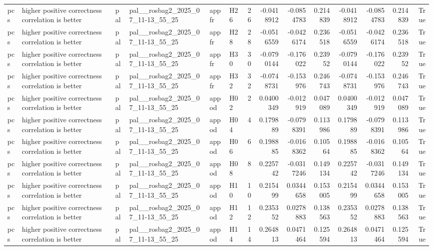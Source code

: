 \begin{longtable}{llllllrrrrrrrr}
pcs & higher positive correctness correlation is better & pal & pal\_\_rosbag2\_2025\_07\_11-13\_55\_25 & appfr & H26 & 26 & -0.0418912 & -0.0854783 & 0.214839 & -0.0418912 & -0.0854783 & 0.214839 & True \\
pcs & higher positive correctness correlation is better & pal & pal\_\_rosbag2\_2025\_07\_11-13\_55\_25 & appfr & H28 & 28 & -0.0516559 & -0.0426174 & 0.236518 & -0.0516559 & -0.0426174 & 0.236518 & True \\
pcs & higher positive correctness correlation is better & pal & pal\_\_rosbag2\_2025\_07\_11-13\_55\_25 & appfr & H30 & 30 & -0.0790144 & -0.176022 & 0.23952 & -0.0790144 & -0.176022 & 0.23952 & True \\
pcs & higher positive correctness correlation is better & pal & pal\_\_rosbag2\_2025\_07\_11-13\_55\_25 & appfr & H32 & 32 & -0.0748731 & -0.153976 & 0.246743 & -0.0748731 & -0.153976 & 0.246743 & True \\
pcs & higher positive correctness correlation is better & pal & pal\_\_rosbag2\_2025\_07\_11-13\_55\_25 & appod & H02 & 2 & 0.0400349 & -0.012919 & 0.047089 & 0.0400349 & -0.012919 & 0.047089 & True \\
pcs & higher positive correctness correlation is better & pal & pal\_\_rosbag2\_2025\_07\_11-13\_55\_25 & appod & H04 & 4 & 0.179889 & -0.0798391 & 0.113986 & 0.179889 & -0.0798391 & 0.113986 & True \\
pcs & higher positive correctness correlation is better & pal & pal\_\_rosbag2\_2025\_07\_11-13\_55\_25 & appod & H06 & 6 & 0.198885 & -0.0168362 & 0.10564 & 0.198885 & -0.0168362 & 0.10564 & True \\
pcs & higher positive correctness correlation is better & pal & pal\_\_rosbag2\_2025\_07\_11-13\_55\_25 & appod & H08 & 8 & 0.225742 & -0.0317246 & 0.149134 & 0.225742 & -0.0317246 & 0.149134 & True \\
pcs & higher positive correctness correlation is better & pal & pal\_\_rosbag2\_2025\_07\_11-13\_55\_25 & appod & H10 & 10 & 0.215499 & 0.0344658 & 0.153005 & 0.215499 & 0.0344658 & 0.153005 & True \\
pcs & higher positive correctness correlation is better & pal & pal\_\_rosbag2\_2025\_07\_11-13\_55\_25 & appod & H12 & 12 & 0.235352 & 0.0278883 & 0.138563 & 0.235352 & 0.0278883 & 0.138563 & True \\
pcs & higher positive correctness correlation is better & pal & pal\_\_rosbag2\_2025\_07\_11-13\_55\_25 & appod & H14 & 14 & 0.264813 & 0.0471464 & 0.125594 & 0.264813 & 0.0471464 & 0.125594 & True \\

\end{longtable}
